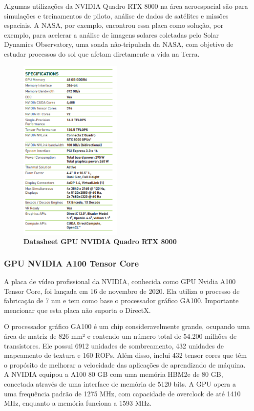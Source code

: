 \documentclass[conference]{IEEEtran}
\begin{document}
\par Algumas utilizações da NVIDIA Quadro RTX 8000  na área aeroespacial são para simulações e treinamentos de piloto, análise de dados de satélites e missões espaciais. A NASA, por exemplo, encontrou essa placa como solução, por exemplo, para acelerar a análise de imagens solares coletadas pelo Solar Dynamics Observatory, uma sonda não-tripulada da NASA, com objetivo de estudar processos do sol que afetam diretamente a vida na Terra.

\begin{figure}[h]
\centerline{\includegraphics[width = 2.0in]{datasheet quadro rtx 8000.png}}
\caption{\textbf{Datasheet GPU NVIDIA Quadro RTX 8000}}
\label{figAM9300}
\end{figure}

\subsubsection{GPU NVIDIA A100 Tensor Core}

\par A placa de vídeo profissional da NVIDIA, conhecida como GPU Nvidia A100 Tensor Core, foi lançada em 16 de novembro de 2020. Ela utiliza o processo de fabricação de 7 nm e tem como base o processador gráfico GA100. Importante mencionar que esta placa não suporta o DirectX.

\par O processador gráfico GA100 é um chip consideravelmente grande, ocupando uma área de matriz de 826 mm² e contendo um número total de 54.200 milhões de transistores. Ele possui 6912 unidades de sombreamento, 432 unidades de mapeamento de textura e 160 ROPs. Além disso, inclui 432 tensor cores que têm o propósito de melhorar a velocidade das aplicações de aprendizado de máquina. A NVIDIA equipou a A100 80 GB com uma memória HBM2e de 80 GB, conectada através de uma interface de memória de 5120 bits. A GPU opera a uma frequência padrão de 1275 MHz, com capacidade de overclock de até 1410 MHz, enquanto a memória funciona a 1593 MHz.
\end{document}

